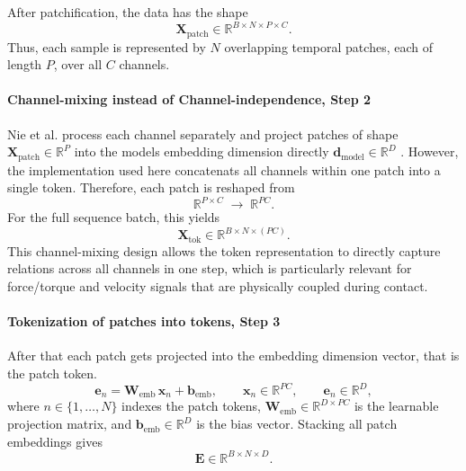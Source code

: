 After patchification, the data has the shape
\begin{equation}
\mathbf{X}_{\text{patch}} \in \mathbb{R}^{B \times N \times P \times C}.
\end{equation}
Thus, each sample is represented by $N$ overlapping temporal patches, each of length $P$, over all $C$ channels.

\paragraph{Channel-mixing instead of Channel-independence,  Step 2}
Nie et al. process each channel separately and project patches of shape $\mathbf{X}_{\text{patch}} \in \mathbb{R}^P$ into the models embedding dimension directly $\mathbf{d}_{\text{model}} \in \mathbb{R}^D$ \cite{nieTimeSeriesWorth2023b}. However, the implementation used here concatenats all channels within one patch into a single token. Therefore, each patch is reshaped from
\begin{equation}
\mathbb{R}^{P \times C}
\;\rightarrow\;
\mathbb{R}^{P C}.
\end{equation}
For the full sequence batch, this yields
\begin{equation}
\mathbf{X}_{\text{tok}} \in \mathbb{R}^{B \times N \times (P C)}.
\end{equation}
This channel-mixing design allows the token representation to directly capture relations across all channels in one step, which is particularly relevant for force/torque and velocity signals that are physically coupled during contact.

\paragraph{Tokenization of patches into tokens,  Step 3}
After that each patch gets projected into the embedding dimension vector, that is the patch token.
\begin{equation}
\mathbf{e}_n = \mathbf{W}_{\text{emb}}\,\mathbf{x}_n + \mathbf{b}_{\text{emb}},
\qquad
\mathbf{x}_n \in \mathbb{R}^{PC},
\qquad
\mathbf{e}_n \in \mathbb{R}^{D},
\end{equation}
where $n \in \{1,\dots,N\}$ indexes the patch tokens, $\mathbf{W}_{\text{emb}} \in \mathbb{R}^{D \times PC}$ is the learnable projection matrix, and $\mathbf{b}_{\text{emb}} \in \mathbb{R}^{D}$ is the bias vector.
Stacking all patch embeddings gives
\begin{equation}
\mathbf{E} \in \mathbb{R}^{B \times N \times D}.
\end{equation}

